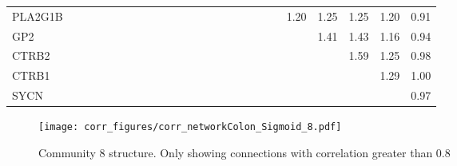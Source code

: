 \begin{longtable}{lrrrrrrrrrrrrrrrrrrrrrrrr}
PLA2G1B  &              &              &              &              &             &             &             &             &            &              &            &            &            &             &           &             &                &           &               &      1.20 &        1.25 &        1.25 &       1.20 &        0.91 \\
GP2      &              &              &              &              &             &             &             &             &            &              &            &            &            &             &           &             &                &           &               &           &        1.41 &        1.43 &       1.16 &        0.94 \\
CTRB2    &              &              &              &              &             &             &             &             &            &              &            &            &            &             &           &             &                &           &               &           &             &        1.59 &       1.25 &        0.98 \\
CTRB1    &              &              &              &              &             &             &             &             &            &              &            &            &            &             &           &             &                &           &               &           &             &             &       1.29 &        1.00 \\
SYCN     &              &              &              &              &             &             &             &             &            &              &            &            &            &             &           &             &                &           &               &           &             &             &            &        0.97 \\
\end{longtable}


\begin{figure}[h!]
\centering
\texttt{[image: corr\_figures/corr\_networkColon\_Sigmoid\_8.pdf]}
\caption{Community 8 structure. Only showing connections with correlation greater than 0.8}
\end{figure}




